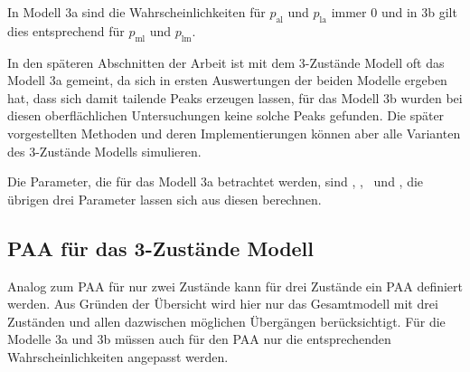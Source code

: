 In Modell 3a sind die Wahrscheinlichkeiten für $p_{\text{al}}$ und $p_{\text{la}}$ immer $0$ und in 3b gilt dies entsprechend für $p_{\text{ml}}$ und $p_{\text{lm}}$.

In den späteren Abschnitten der Arbeit ist mit dem 3-Zustände Modell oft das Modell 3a gemeint, da sich in ersten Auswertungen der beiden Modelle ergeben hat, dass sich damit tailende Peaks erzeugen lassen, für das Modell 3b wurden bei diesen oberflächlichen Untersuchungen keine solche Peaks gefunden. Die später vorgestellten Methoden und deren Implementierungen können aber alle Varianten des 3-Zustände Modells simulieren.

Die Parameter, die für das Modell 3a betrachtet werden, sind \pmm, \pml, \paa\ und \pll, die übrigen drei Parameter lassen sich aus diesen berechnen.


\subsection{PAA für das 3-Zustände Modell}
Analog zum PAA für nur zwei Zustände kann für drei Zustände ein PAA definiert werden. Aus Gründen der Übersicht wird hier nur das Gesamtmodell mit drei Zuständen und allen dazwischen möglichen Übergängen berücksichtigt. Für die Modelle 3a und 3b müssen auch für den PAA nur die entsprechenden Wahrscheinlichkeiten angepasst werden.

